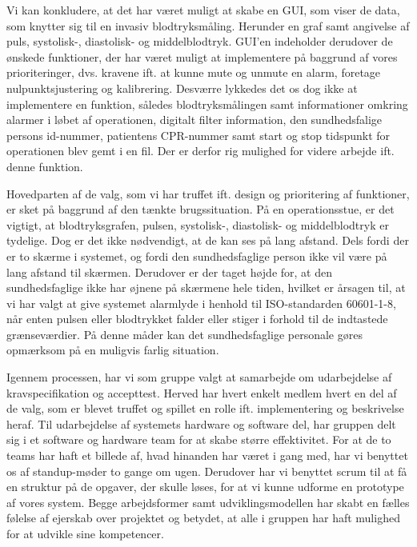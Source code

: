Vi kan konkludere, at det har været muligt at skabe en GUI, som viser de data, som knytter sig til en invasiv blodtryksmåling. Herunder en graf samt angivelse af puls, systolisk-, diastolisk- og middelblodtryk. GUI’en indeholder derudover de ønskede funktioner, der har været muligt at implementere på baggrund af vores prioriteringer, dvs. kravene ift. at kunne mute og unmute en alarm, foretage nulpunktsjustering og kalibrering.
Desværre lykkedes det os dog ikke at implementere en funktion, således blodtryksmålingen samt informationer omkring alarmer i løbet af operationen, digitalt filter information, den sundhedsfalige persons id-nummer, patientens CPR-nummer samt start og stop tidspunkt for operationen blev gemt i en fil. Der er derfor rig mulighed for videre arbejde ift. denne funktion. 

Hovedparten af de valg, som vi har truffet ift. design og prioritering af funktioner, er sket på baggrund af den tænkte brugssituation. På en operationsstue, er det vigtigt, at blodtryksgrafen, pulsen, systolisk-, diastolisk- og middelblodtryk er tydelige. Dog er det ikke nødvendigt, at de kan ses på lang afstand. Dels fordi der er to skærme i systemet, og fordi den sundhedsfaglige person ikke vil være på lang afstand til skærmen. Derudover er der taget højde for, at den sundhedsfaglige ikke har øjnene på skærmene hele tiden, hvilket er årsagen til, at vi har valgt at give systemet alarmlyde i henhold til ISO-standarden 60601-1-8, når enten pulsen eller blodtrykket falder eller stiger i forhold til de indtastede grænseværdier. På denne måder kan det sundhedsfaglige personale gøres opmærksom på en muligvis farlig situation. 

Igennem processen, har vi som gruppe valgt at samarbejde om udarbejdelse af kravspecifikation og accepttest. Herved har hvert enkelt medlem hvert en del af de valg, som er blevet truffet og spillet en rolle ift. implementering og beskrivelse heraf. Til udarbejdelse af systemets hardware og software del, har gruppen delt sig i et software og hardware team for at skabe større effektivitet. For at de to teams har haft et billede af, hvad hinanden har været i gang med, har vi benyttet os af standup-møder to gange om ugen. Derudover har vi benyttet scrum til at få en struktur på de opgaver, der skulle løses, for at vi kunne udforme en prototype af vores system. Begge arbejdsformer samt udviklingsmodellen har skabt en fælles følelse af ejerskab over projektet og betydet, at alle i gruppen har haft mulighed for at udvikle sine kompetencer.
